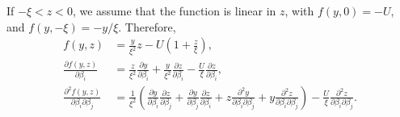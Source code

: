 \documentclass[12pt,a4paper]{article}
\begin{document}
\begin{description}
  If $-\xi < z < 0$, we assume that the function is linear in $z$, with $f(y, 0) = -U$, and $f(y,  -\xi)= -y/\xi$. Therefore,
  \begin{align*}
    f(y, z) &=\frac{y}{\xi^2} z - U \left(1 + \frac{z}{\xi}\right),  \\
    \frac{\partial f(y, z)}{\partial \beta_i} &= \frac{z}{\xi^2} \frac{\partial y}{\partial \beta_i} + \frac{y}{\xi^2} \frac{\partial z}{\partial \beta_i} -\frac{ U}{\xi} \frac{\partial z}{\partial \beta_i},    \\
    \frac{\partial^2 f(y, z)}{\partial \beta_i \partial \beta_j} &=
    \frac{1}{\xi^2} \left( \frac{\partial y}{\partial \beta_i} \frac{\partial z}{\partial \beta_j}
    + \frac{\partial y}{\partial \beta_j} \frac{\partial z}{\partial \beta_i} +z \frac{\partial^2 y}{\partial \beta_i \partial \beta_j} + y \frac{\partial^2 z}{\partial \beta_i \partial \beta_j}\right) - \frac{U}{\xi}\frac{\partial^2 z}{\partial \beta_i \partial \beta_j}.
  \end{align*}


\end{description}
\end{document}
